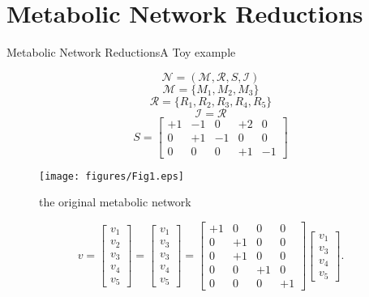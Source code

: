 \documentclass[10pt]{beamer}
\theoremstyle{remark}
\theoremstyle{definition}
\begin{document}
\section{Metabolic Network Reductions}
\begin{frame}{Metabolic Network Reductions}{A Toy example}
\noindent
\begin{minipage}[t]{.49\textwidth}
\raggedright
\[
\mathcal{N} = (\mathcal{M}, \mathcal{R}, S, \mathcal{I})
\] 
\[
\mathcal{M}=\{M_1, M_2, M_3\}
\]
\[
\mathcal{R}=\{R_1,R_2,R_3,R_4,R_5\}
\] 
\[
\mathcal{I}=\mathcal{R}
\]
\[
S = \left[
\begin{array}{ccccc}
+1 & -1 & 0 & +2 & 0\\
0 & +1 & -1 & 0 & 0\\
0 & 0 & 0 & +1 & -1
\end{array}
\right]
\]
\end{minipage}
\hfill
\begin{minipage}[t]{.49\textwidth}
\raggedleft
\begin{figure}[ht]
    \centering
    \texttt{[image: figures/Fig1.eps]}
    \caption{the original metabolic network}
\end{figure}
\end{minipage}\pause
\[
v = \left[
\begin{array}{c}
v_1\\
v_2\\
v_3\\
v_4\\
v_5
\end{array}
\right] = \left[
\begin{array}{c}
v_1\\
v_3\\
v_3\\
v_4\\
v_5
\end{array}
\right] = \left[
\begin{array}{cccc}
+1 & 0 & 0 & 0\\
0 & +1 & 0 & 0\\
0 & +1 & 0 & 0\\
0 & 0 & +1 & 0\\
0 & 0 & 0 & +1
\end{array}
\right]\left[
\begin{array}{c}
v_1\\
v_3\\
v_4\\
v_5
\end{array}
\right].
\]
\end{frame}
\end{document}
